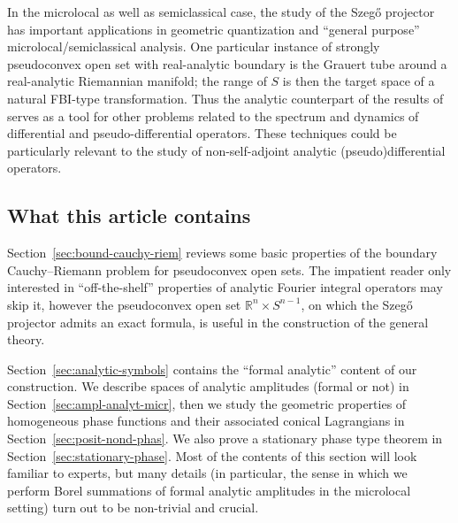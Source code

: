 \documentclass[10pt]{amsart}
\theoremstyle{definition}\newtheorem{defi}[theo]{Definition}\newtheorem{rema}[theo]{Remark}\newtheorem{exam}[theo]{Example}\newtheorem{exem}[theo]{Example}\newtheorem{nota}[theo]{Notation}
\newcommand\1{\mathds{1}}
\newcommand{\R}{\mathbb{R}}
\begin{document}
In the microlocal as well as semiclassical case, the study of the Szeg\H{o} projector has important applications in geometric quantization and ``general purpose'' microlocal/semiclassical analysis. One particular instance of strongly pseudoconvex open set with real-analytic boundary is the Grauert tube around a real-analytic Riemannian manifold; the range of $S$ is then the target space of a natural FBI-type transformation. Thus the analytic counterpart of the results of~\cite{boutet_de_monvel_sur_1975} serves as a tool for other problems related to the spectrum and dynamics of differential and pseudo-differential operators. These techniques could be particularly relevant to the study of non-self-adjoint analytic (pseudo)differential operators.

\subsection{What this article contains}\label{sec:what-this-article}

Section~\ref{sec:bound-cauchy-riem} reviews some basic properties of the boundary Cauchy--Riemann problem for pseudoconvex open sets. The impatient reader only interested in ``off-the-shelf'' properties of analytic Fourier integral operators may skip it, however the pseudoconvex open set $\R^n\times S^{n-1}$, on which the Szeg\H{o} projector admits an exact formula, is useful in the construction of the general theory.

Section~\ref{sec:analytic-symbols} contains the ``formal analytic'' content of our construction. We describe spaces of analytic amplitudes (formal or not) in Section~\ref{sec:ampl-analyt-micr}, then we study the geometric properties of homogeneous phase functions and their associated conical Lagrangians in Section~\ref{sec:posit-nond-phas}. We also prove a stationary phase type theorem in Section~\ref{sec:stationary-phase}. Most of the contents of this section will look familiar to experts, but many details (in particular, the sense in which we perform Borel summations of formal analytic amplitudes in the microlocal setting) turn out to be non-trivial and crucial.
\end{document}
